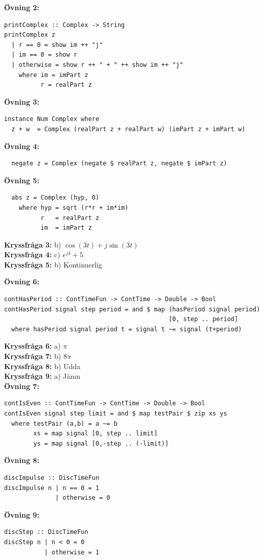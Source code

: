 \documentclass{article}
\begin{document}
\textbf{Övning 2:}
\begin{verbatim}
printComplex :: Complex -> String
printComplex z
  | r == 0 = show im ++ "j"
  | im == 0 = show r
  | otherwise = show r ++ " + " ++ show im ++ "j"
    where im = imPart z
          r = realPart z
\end{verbatim}

\textbf{Övning 3:}
\begin{verbatim}
instance Num Complex where
  z + w  = Complex (realPart z + realPart w) (imPart z + imPart w)
\end{verbatim}

\textbf{Övning 4:}
\begin{verbatim}
  negate z = Complex (negate $ realPart z, negate $ imPart z)
\end{verbatim}

\textbf{Övning 5:}
\begin{verbatim}
  abs z = Complex (hyp, 0)
    where hyp = sqrt (r*r + im*im)
          r   = realPart z
          im  = imPart z
\end{verbatim}

\textbf{Kryssfråga 3:} b) $\cos(3t) + j\sin(3t)$
\\

\textbf{Kryssfråga 4:} c) $e^{j4} + 5$
\\

\textbf{Kryssfråga 5:} b) Kontinuerlig

\newpage

\textbf{Övning 6:}
\begin{verbatim}
contHasPeriod :: ContTimeFun -> ContTime -> Double -> Bool
contHasPeriod signal step period = and $ map (hasPeriod signal period)
                                             [0, step .. period]
  where hasPeriod signal period t = signal t ~= signal (t+period)
\end{verbatim}


\textbf{Kryssfråga 6:} a) $\pi$
\\

\textbf{Kryssfråga 7:} b) $8\pi$
\\

\textbf{Kryssfråga 8:} b) Udda
\\

\textbf{Kryssfråga 9:} a) Jämn
\\

\textbf{Övning 7:}
\begin{verbatim}
contIsEven :: ContTimeFun -> ContTime -> Double -> Bool
contIsEven signal step limit = and $ map testPair $ zip xs ys
  where testPair (a,b) = a ~= b
        xs = map signal [0, step .. limit]
        ys = map signal [0,-step .. (-limit)]
\end{verbatim}


\textbf{Övning 8:}
\begin{verbatim}
discImpulse :: DiscTimeFun
discImpulse n | n == 0 = 1
              | otherwise = 0
\end{verbatim}

\textbf{Övning 9:}
\begin{verbatim}
discStep :: DiscTimeFun
discStep n | n < 0 = 0
           | otherwise = 1
\end{verbatim}
\end{document}
